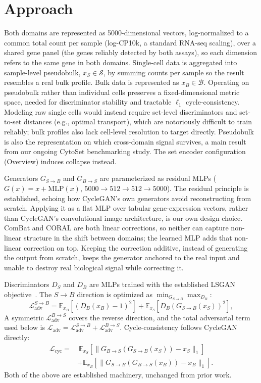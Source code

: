 \section{Approach}
Both domains are represented as 5000-dimensional vectors, log-normalized to a common total count per
sample (log-CP10k, a standard RNA-seq scaling), over a shared gene panel (the genes reliably detected by
both assays), so each dimension refers to the same gene in both domains.
Single-cell data is aggregated into sample-level pseudobulk, $x_S \in \mathcal{S}$, by summing counts per
sample so the result resembles a real bulk profile. Bulk data is represented as $x_B \in \mathcal{B}$.
Operating on pseudobulk rather than individual cells preserves a fixed-dimensional metric space, needed
for discriminator stability and tractable $\ell_1$ cycle-consistency. Modeling raw single cells would
instead require set-level discriminators and set-to-set distances (e.g., optimal transport), which are
notoriously difficult to train reliably; bulk profiles also lack cell-level
resolution to target directly. Pseudobulk is also the representation on which cross-domain signal survives, a main result from our
ongoing CytoSet benchmarking study. The set encoder configuration (Overview) induces collapse instead.

Generators $G_{S \to B}$ and $G_{B \to S}$ are parameterized as residual MLPs
($G(x) = x + \text{MLP}(x)$, $5000 \to 512 \to 512 \to 5000$). The residual principle is established,
echoing how CycleGAN's own generators avoid reconstructing from scratch. Applying it as a flat MLP over
tabular gene-expression vectors, rather than CycleGAN's convolutional image architecture, is our own
design choice. ComBat and CORAL are both linear corrections, so neither can capture non-linear structure in the shift
between domains; the learned MLP adds that non-linear correction on top. Keeping the correction
additive, instead of generating the output from scratch, keeps the generator anchored to the real input
and unable to destroy real biological signal while correcting it.

Discriminators $D_S$ and $D_B$ are MLPs trained with the established LSGAN objective~\cite{mao2017lsgan}.
The $S \to B$ direction is optimized as
$\min_{G_{S \to B}} \max_{D_B}$:
\begin{equation}
\mathcal{L}_{\text{adv}}^{S \to B} = \mathbb{E}_{x_B}[(D_B(x_B){-}1)^2] + \mathbb{E}_{x_S}[D_B(G_{S \to B}(x_S))^2],
\end{equation}
A symmetric $\mathcal{L}_{\text{adv}}^{B \to S}$ covers the reverse direction, and the total adversarial term used below is
$\mathcal{L}_{\text{adv}} = \mathcal{L}_{\text{adv}}^{S \to B} + \mathcal{L}_{\text{adv}}^{B \to S}$.
Cycle-consistency follows CycleGAN~\cite{zhu2017cyclegan} directly:
\begin{equation}
\begin{split}
\mathcal{L}_{\text{cyc}} = &\ \mathbb{E}_{x_S}[\|G_{B \to S}(G_{S \to B}(x_S)) - x_S\|_1] \\
&+ \mathbb{E}_{x_B}[\|G_{S \to B}(G_{B \to S}(x_B)) - x_B\|_1].
\end{split}
\end{equation}
Both of the above are established machinery, unchanged from prior work.

